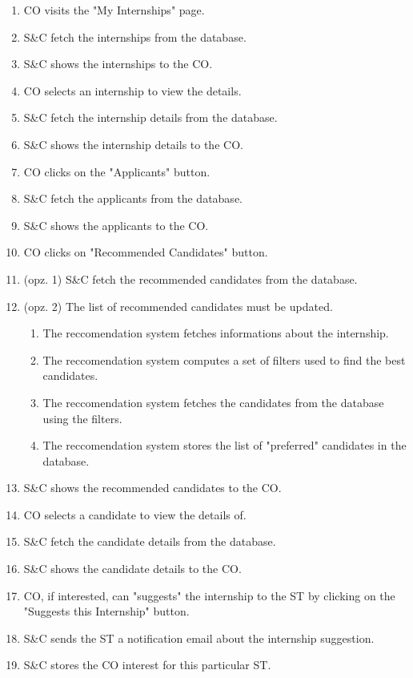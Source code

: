 \begin{enumerate}
    \item CO visits the "My Internships" page.
    \item S\&C fetch the internships from the database.
    \item S\&C shows the internships to the CO.
    \item CO selects an internship to view the details.
    \item S\&C fetch the internship details from the database.
    \item S\&C shows the internship details to the CO.
    \item CO clicks on the "Applicants" button.
    \item S\&C fetch the applicants from the database.
    \item S\&C shows the applicants to the CO.
    \item CO clicks on "Recommended Candidates" button.
    \item (opz. 1) S\&C fetch the recommended candidates from the database.
    \item (opz. 2) The list of recommended candidates must be updated.
    \begin{enumerate}
        \item The reccomendation system fetches informations about the internship.
        \item The reccomendation system computes a set of filters used to find the best candidates.
        \item The reccomendation system fetches the candidates from the database using the filters.
        \item The reccomendation system stores the list of "preferred" candidates in the database.
    \end{enumerate}
    \item S\&C shows the recommended candidates to the CO.
    \item CO selects a candidate to view the details of.
    \item S\&C fetch the candidate details from the database.
    \item S\&C shows the candidate details to the CO.
    \item CO, if interested, can "suggests" the internship to the ST by clicking on the "Suggests this Internship" button.
    \item S\&C sends the ST a notification email about the internship suggestion.
    \item S\&C stores the CO interest for this particular ST.
\end{enumerate}

